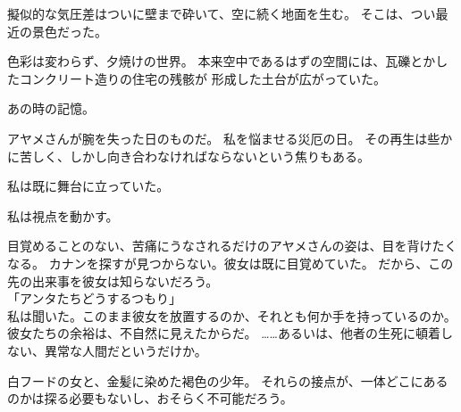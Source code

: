 \documentclass[../IHMain]{subfiles}
\begin{document}
擬似的な気圧差はついに壁まで砕いて、空に続く地面を生む。
そこは、つい最近の景色だった。

色彩は変わらず、夕焼けの世界。
本来空中であるはずの空間には、瓦礫とかしたコンクリート造りの住宅の残骸が
形成した土台が広がっていた。

あの時の記憶。

アヤメさんが腕を失った日のものだ。
私を悩ませる災厄の日。
その再生は些かに苦しく、しかし向き合わなければならないという焦りもある。

私は既に舞台に立っていた。

私は視点を動かす。

目覚めることのない、苦痛にうなされるだけのアヤメさんの姿は、目を背けたくなる。
カナンを探すが見つからない。彼女は既に目覚めていた。
だから、この先の出来事を彼女は知らないだろう。\\

「アンタたちどうするつもり」\\
私は聞いた。このまま彼女を放置するのか、それとも何か手を持っているのか。
彼女たちの余裕は、不自然に見えたからだ。
……あるいは、他者の生死に頓着しない、異常な人間だというだけか。

白フードの女と、金髪に染めた褐色の少年。
それらの接点が、一体どこにあるのかは探る必要もないし、おそらく不可能だろう。
\end{document}
